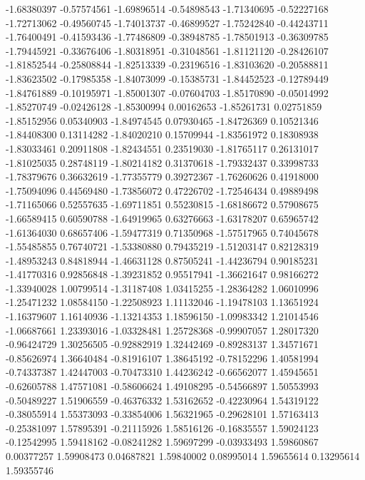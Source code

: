 -1.68380397  -0.57574561 
-1.69896514  -0.54898543 
-1.71340695  -0.52227168 
-1.72713062  -0.49560745 
-1.74013737  -0.46899527 
-1.75242840  -0.44243711 
-1.76400491  -0.41593436 
-1.77486809  -0.38948785 
-1.78501913  -0.36309785 
-1.79445921  -0.33676406 
-1.80318951  -0.31048561 
-1.81121120  -0.28426107 
-1.81852544  -0.25808844 
-1.82513339  -0.23196516 
-1.83103620  -0.20588811 
-1.83623502  -0.17985358 
-1.84073099  -0.15385731 
-1.84452523  -0.12789449 
-1.84761889  -0.10195971 
-1.85001307  -0.07604703 
-1.85170890  -0.05014992 
-1.85270749  -0.02426128 
-1.85300994  0.00162653  
-1.85261731  0.02751859  
-1.85152956  0.05340903  
-1.84974545  0.07930465  
-1.84726369  0.10521346  
-1.84408300  0.13114282  
-1.84020210  0.15709944  
-1.83561972  0.18308938  
-1.83033461  0.20911808  
-1.82434551  0.23519030  
-1.81765117  0.26131017  
-1.81025035  0.28748119  
-1.80214182  0.31370618  
-1.79332437  0.33998733  
-1.78379676  0.36632619  
-1.77355779  0.39272367  
-1.76260626  0.41918000  
-1.75094096  0.44569480  
-1.73856072  0.47226702  
-1.72546434  0.49889498  
-1.71165066  0.52557635  
-1.69711851  0.55230815  
-1.68186672  0.57908675  
-1.66589415  0.60590788  
-1.64919965  0.63276663  
-1.63178207  0.65965742  
-1.61364030  0.68657406  
-1.59477319  0.71350968  
-1.57517965  0.74045678  
-1.55485855  0.76740721  
-1.53380880  0.79435219  
-1.51203147  0.82128319  
-1.48953243  0.84818944  
-1.46631128  0.87505241  
-1.44236794  0.90185231  
-1.41770316  0.92856848  
-1.39231852  0.95517941  
-1.36621647  0.98166272  
-1.33940028  1.00799514  
-1.31187408  1.03415255  
-1.28364282  1.06010996  
-1.25471232  1.08584150  
-1.22508923  1.11132046  
-1.19478103  1.13651924  
-1.16379607  1.16140936  
-1.13214353  1.18596150  
-1.09983342  1.21014546  
-1.06687661  1.23393016  
-1.03328481  1.25728368  
-0.99907057  1.28017320  
-0.96424729  1.30256505  
-0.92882919  1.32442469  
-0.89283137  1.34571671  
-0.85626974  1.36640484  
-0.81916107  1.38645192  
-0.78152296  1.40581994  
-0.74337387  1.42447003  
-0.70473310  1.44236242  
-0.66562077  1.45945651  
-0.62605788  1.47571081  
-0.58606624  1.49108295  
-0.54566897  1.50553993  
-0.50489227  1.51906559  
-0.46376332  1.53162652  
-0.42230964  1.54319122  
-0.38055914  1.55373093  
-0.33854006  1.56321965  
-0.29628101  1.57163413  
-0.25381097  1.57895391  
-0.21115926  1.58516126  
-0.16835557  1.59024123  
-0.12542995  1.59418162  
-0.08241282  1.59697299  
-0.03933493  1.59860867  
0.00377257   1.59908473  
0.04687821   1.59840002  
0.08995014   1.59655614  
0.13295614   1.59355746 